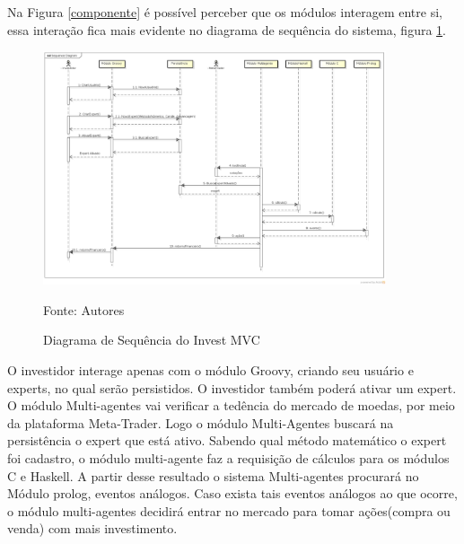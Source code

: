 Na Figura \ref{componente} é possível perceber que os módulos interagem entre si, essa interação fica mais evidente no diagrama de sequência do sistema, figura \ref{sequencia}.

\begin{figure}[htp]
\centering
\includegraphics[width=0.9\textwidth]{figuras/sequencia}
\caption{Diagrama de Sequência do Invest MVC}{Fonte: Autores} 
\label{sequencia}
\end{figure}

O investidor interage apenas com o módulo Groovy, criando seu usuário e experts, no qual serão persistidos. O investidor também poderá ativar um expert.
O módulo Multi-agentes vai verificar a tedência do mercado de moedas, por meio da plataforma Meta-Trader. Logo o módulo Multi-Agentes buscará na persistência o expert que está ativo. Sabendo qual método matemático o expert foi cadastro, o módulo multi-agente faz a requisição de cálculos para os módulos C e Haskell. A partir desse resultado o sistema Multi-agentes procurará no Módulo prolog, eventos análogos. Caso exista tais eventos análogos ao que ocorre, o módulo multi-agentes decidirá entrar no mercado para tomar ações(compra ou venda) com mais investimento.
